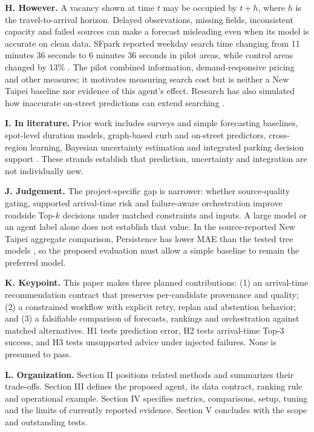 \documentclass[conference,letterpaper,10pt]{IEEEtran}
\begin{document}
\noindent\textbf{H. However.} A vacancy shown at time $t$ may be occupied by $t+h$, where $h$ is the travel-to-arrival horizon. Delayed observations, missing fields, inconsistent capacity and failed sources can make a forecast misleading even when its model is accurate on clean data. SFpark reported weekday search time changing from 11 minutes 36 seconds to 6 minutes 36 seconds in pilot areas, while control areas changed by 13\% \cite{sfmta2014}. The pilot combined information, demand-responsive pricing and other measures; it motivates measuring search cost but is neither a New Taipei baseline nor evidence of this agent's effect. Research has also simulated how inaccurate on-street predictions can extend searching \cite{cao2025}.

\noindent\textbf{I. In literature.} Prior work includes surveys and simple forecasting baselines, spot-level duration models, graph-based curb and on-street predictors, cross-region learning, Bayesian uncertainty estimation and integrated parking decision support \cite{ma2024,schneble2025,cao2025,qian2025,vakrinou2026,kuang2025,nezhadettehad2025,piccialli2025}. These strands establish that prediction, uncertainty and integration are not individually new.

\noindent\textbf{J. Judgement.} The project-specific gap is narrower: whether source-quality gating, supported arrival-time risk and failure-aware orchestration improve roadside Top-$k$ decisions under matched constraints and inputs. A large model or an agent label alone does not establish that value. In the source-reported New Taipei aggregate comparison, Persistence has lower MAE than the tested tree models \cite{dic3design}, so the proposed evaluation must allow a simple baseline to remain the preferred model.

\noindent\textbf{K. Keypoint.} This paper makes three planned contributions: (1) an arrival-time recommendation contract that preserves per-candidate provenance and quality; (2) a constrained workflow with explicit retry, replan and abstention behavior; and (3) a falsifiable comparison of forecasts, rankings and orchestration against matched alternatives. H1 tests prediction error, H2 tests arrival-time Top-3 success, and H3 tests unsupported advice under injected failures. None is presumed to pass.

\noindent\textbf{L. Organization.} Section II positions related methods and summarizes their trade-offs. Section III defines the proposed agent, its data contract, ranking rule and operational example. Section IV specifies metrics, comparisons, setup, tuning and the limits of currently reported evidence. Section V concludes with the scope and outstanding tests.
\end{document}
